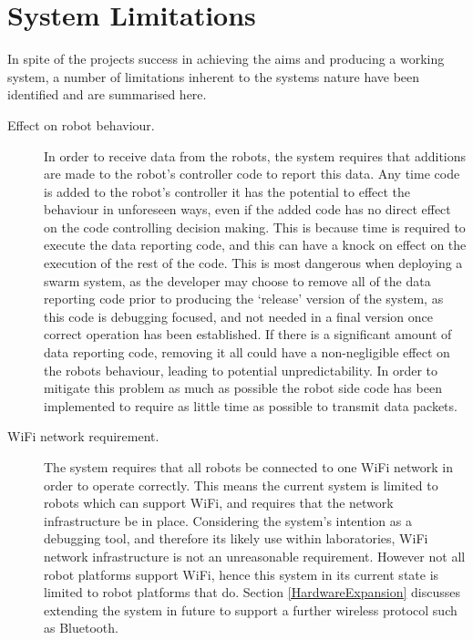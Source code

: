 
\section{System Limitations}

In spite of the projects success in achieving the aims and producing a working system, a number of limitations inherent to the systems nature have been identified and are summarised here.

\begin{description}
 \item [Effect on robot behaviour.] In order to receive data from the robots, the system requires that   additions are made to the robot's controller code to report this data. Any time code is added to the robot's controller it has the potential to effect the behaviour in unforeseen ways, even if the added code has no direct effect on the code controlling decision making. This is because time is required to execute the data reporting code, and this can have a knock on effect on the execution of the rest of the code. This is most dangerous when deploying a swarm system, as the developer may choose to remove all of the data reporting code prior to producing the `release' version of the system, as this code is debugging focused, and not needed in a final version once correct operation has been established. If there is a significant amount of data reporting code, removing it all could have a non-negligible effect on the robots behaviour, leading to potential unpredictability. In order to mitigate this problem as much as possible the robot side code has been implemented to require as little time as possible to transmit data packets.
 
\item [WiFi network requirement.] The system requires that all robots be connected to one WiFi network in order to operate correctly. This means the current system is limited to robots which can support WiFi, and requires that the network infrastructure be in place. Considering the system's intention as a debugging tool, and therefore its likely use within laboratories, WiFi network infrastructure is not an unreasonable requirement. However not all robot platforms support WiFi, hence this system in its current state is limited to robot platforms that do. Section \ref{HardwareExpansion} discusses extending the system in future to support a further wireless protocol such as Bluetooth.


\end{description}
